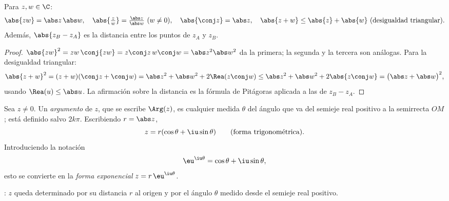 \begin{proposition}\label{prop:g12:complex:modulus}
Para $z, w \in \C$:
\[
\abs{zw} = \abs z\,\abs w, \quad
\abs{\tfrac zw} = \tfrac{\abs z}{\abs w}\ (w \neq 0), \quad
\abs{\conj z} = \abs z, \quad
\abs{z + w} \leq \abs{z} + \abs{w} \ \text{(desigualdad triangular)}.
\]
Además, $\abs{z_B - z_A}$ es la distancia entre los puntos de  $z_A$
y $z_B$.
\end{proposition}

\begin{proof}
$\abs{zw}^2 = zw\,\conj{zw} = z\conj z\, w \conj w = \abs z^2 \abs w^2$ da
la primera; la segunda y la tercera son análogas. Para la desigualdad
triangular:
\[
\abs{z+w}^2 = (z+w)(\conj z + \conj w)
= \abs z^2 + \abs w^2 + 2\Rea(z \conj w)
\leq \abs z^2 + \abs w^2 + 2\abs{z\conj w}
= \bigl(\abs z + \abs w\bigr)^2,
\]
usando $\Rea(u) \leq \abs u$. La afirmación sobre la distancia es la
fórmula de Pitágoras aplicada a las  de $z_B - z_A$.
\end{proof}

\begin{definition}\label{def:g12:complex:argument}
Sea $z \neq 0$. Un \emph{argumento} de $z$, que se escribe
$\Arg(z)$, es cualquier medida $\theta$ del ángulo que va del semieje real
positivo a la semirrecta $OM$; está definido salvo $2k\pi$. Escribiendo
$r = \abs z$,
\[
z = r(\cos\theta + \iu\sin\theta)
\qquad\text{(forma trigonométrica)}.
\]
Introduciendo la notación
\[
\eu^{\iu\theta} = \cos\theta + \iu\sin\theta,
\]
esto se convierte en la \emph{forma exponencial}
$z = r\,\eu^{\iu\theta}$.
\end{definition}

\begin{omfigure}

{\small {}: $z$ queda determinado por su distancia $r$ al
origen y por el ángulo $\theta$ medido desde el semieje real positivo.}
\end{omfigure}

